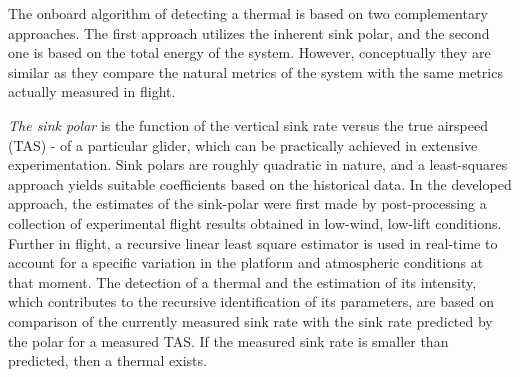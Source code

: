 \documentclass[letterpaper, 10 pt, conference]{ieeeconf}  %
\begin{document}
The onboard algorithm of detecting a thermal is based on two complementary approaches. The first approach utilizes the inherent sink polar, and the second one is based on the total energy of the system. However, conceptually they are similar as they compare the natural metrics of the system with the same metrics actually measured in flight.

\emph{The sink polar} is the function of the vertical sink rate versus the true airspeed (TAS) - of a particular glider, which can be practically achieved in extensive experimentation. Sink polars are roughly quadratic in nature, and a least-squares approach yields suitable coefficients based on the historical data. In the developed approach, the estimates of the sink-polar were first made by post-processing a collection of experimental flight results obtained in low-wind, low-lift conditions. Further in flight, a recursive linear least square estimator is used in real-time to account for a specific variation in the platform and atmospheric conditions at that moment. The detection of a thermal and the estimation of its intensity, which contributes to the recursive identification of its parameters, are based on comparison of the currently measured sink rate with the sink rate predicted by the polar for a measured TAS. If the measured sink rate is smaller than predicted, then a thermal exists.
\end{document}
